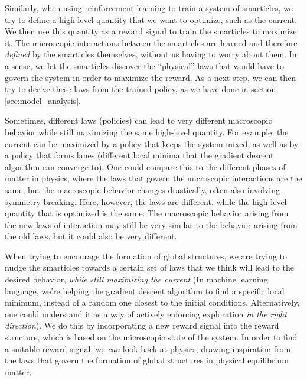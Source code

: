 Similarly, when using reinforcement learning to train a system of smarticles, we try to define a high-level quantity that we want to optimize, such as the current. We then use this quantity as a reward signal to train the smarticles to maximize it. The microscopic interactions between the smarticles are learned and therefore \textit{defined} by the smarticles themselves, without us having to worry about them. In a sense, we let the smarticles discover the \enquote{physical} laws that would have to govern the system in order to maximize the reward. As a next step, we can then try to derive these laws from the trained policy, as we have done in section \ref{sec:model_analysis}.


Sometimes, different laws (policies) can lead to very different macroscopic behavior while still maximizing the same high-level quantity. For example, the current can be maximized by a policy that keeps the system mixed, as well as by a policy that forms lanes (different local minima that the gradient descent algorithm can converge to). One could compare this to the different phases of matter in physics, where the laws that govern the microscopic interactions are the same, but the macroscopic behavior changes drastically, often also involving symmetry breaking. Here, however, the laws are different, while the high-level quantity that is optimized is the same. The macroscopic behavior arising from the new laws of interaction may still be very similar to the behavior arising from the old laws, but it could also be very different. 


When trying to encourage the formation of global structures, we are trying to nudge the smarticles towards a certain set of laws that we think will lead to the desired behavior, \textit{while still maximizing the current} (In machine learning language, we're helping the gradient descent algorithm to find a specific local minimum, instead of a random one closest to the initial conditions. Alternatively, one could understand it as a way of actively enforcing exploration \textit{in the right direction}).  We do this by incorporating a new reward signal into the reward structure, which is based on the microscopic state of the system. In order to find a suitable reward signal, we \textit{can} look back at physics, drawing inspiration from the laws that govern the formation of global structures in physical equilibrium matter.

